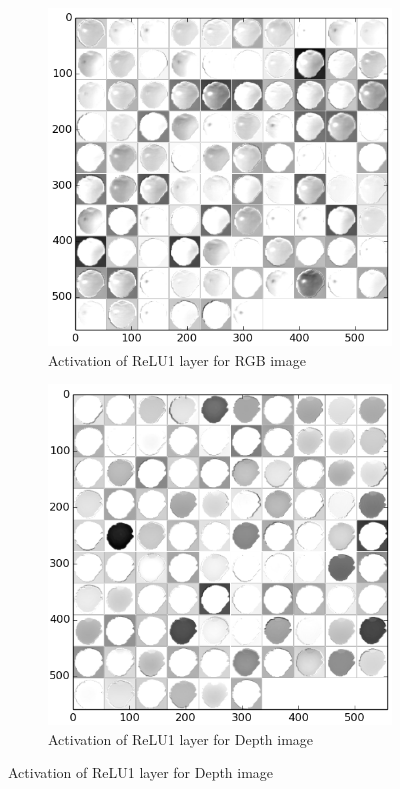 \begin{figure}
	\centering
	\begin{subfigure}[b]{0.45\linewidth}
		\includegraphics[width=\textwidth]{img/relu1_rgb.png}
		\caption{Activation of ReLU1 layer for RGB image}
	\end{subfigure}   	
	\begin{subfigure}[b]{0.45\linewidth}
		\includegraphics[width=\textwidth]{img/relu1_dep.png}
		\caption{Activation of ReLU1 layer for Depth image}
	\end{subfigure}
	

\end{figure}
